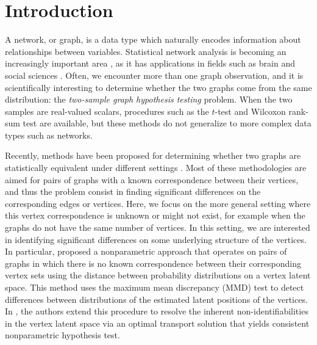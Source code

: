 \pagebreak

\section{Introduction}\label{sec:introduction}
A network, or graph, is a data type which naturally encodes information about relationships between variables.
Statistical network analysis is becoming an increasingly important area \cite{goldenberg2010survey}, as it has applications in fields such as brain \cite{bullmore2009complex} and social sciences \cite{wasserman1994social}. Often, we encounter more than one graph observation, and it is  scientifically interesting to determine whether the two graphs come from the same distribution: the \textit{two-sample graph hypothesis testing} problem. 
When the two samples are real-valued scalars, procedures such as the $t$-test and Wilcoxon rank-sum test are available, but these methods do not generalize to more complex data types such as networks.

Recently, methods have been proposed for determining whether two graphs are statistically equivalent under different settings \cite{semipar, omni, tang2014nonparametric, graph-comparison-same-1, graph-comparison-same-3, graph-comparison-same-4, graph-comparison-other-1, graph-comparison-other-2, graph-comparison-other-5, graph-comparison-other-8, graph-comparison-other-9}.
Most of these methodologies are aimed for pairs of graphs with a known correspondence between their vertices, and thus the problem consist in finding significant differences on the corresponding edges or vertices. 
Here, we focus on the more general setting where this vertex correspondence is unknown or might not exist, for example when the graphs do not have the same number of vertices. 
In this setting, we are interested in identifying significant differences on some underlying structure of the vertices.
In particular, \cite{tang2014nonparametric} proposed a nonparametric approach that operates on pairs of graphs in which there is no known correspondence between their corresponding vertex sets using the distance between probability distributions on a vertex latent space. This method uses the maximum mean discrepancy (MMD) test to detect differences between  distributions of the estimated latent positions of the vertices.
In \cite{agterberg2020nonparametric}, the authors extend this procedure to resolve the inherent non-identifiabilities in the vertex latent space via an optimal transport solution that yields consistent nonparametric hypothesis test.

